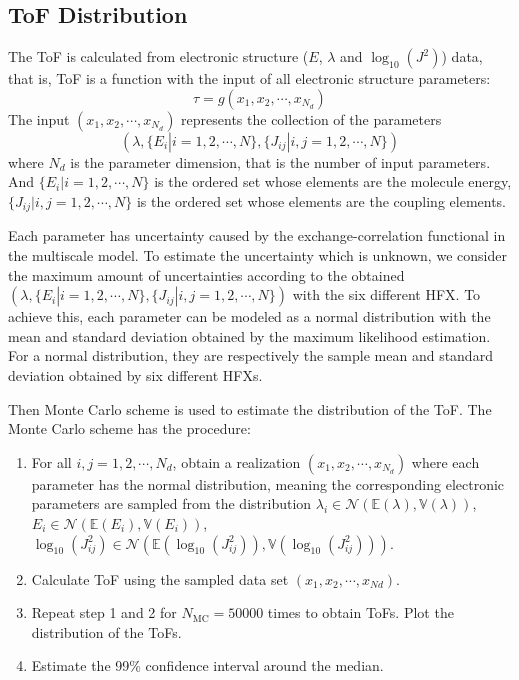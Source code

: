 \documentclass[%
 reprint,
 amsmath,amssymb,
 aps,
]{revtex4-2}
\begin{document}
\subsection{ToF Distribution}
The ToF is calculated from electronic structure ($E$, $\lambda$ and $\log_{10}(J^2)$) data, that is, ToF is a function with the input of all electronic structure parameters:
\begin{equation}
    \tau = g(x_1, x_2, \cdots, x_{N_d})
    \label{eq:tau1}
\end{equation}
The input $(x_1, x_2, \cdots, x_{N_d})$ represents the collection of the parameters $$(\lambda, \{E_i|i=1,2,\cdots,N \}, \{J_{ij}|i,j=1,2,\cdots,N \})$$  where $N_d$ is the parameter dimension, that is the number of input parameters. 
And $\{E_i|i=1,2,\cdots,N \}$ is the ordered set whose elements are the molecule energy,
$\{J_{ij}|i,j=1,2,\cdots,N \}$ is the ordered set whose elements are the coupling elements. 

Each parameter has uncertainty caused by the exchange-correlation functional in the multiscale model.
To estimate the uncertainty which is unknown, we consider the maximum amount of uncertainties according to the obtained $(\lambda, \{E_i|i=1,2,\cdots,N \}, \{J_{ij}|i,j=1,2,\cdots,N \})$ with the six different HFX.
To achieve this, each parameter can be modeled as a normal distribution with the mean and standard deviation obtained by the maximum likelihood estimation. For a normal distribution, they are respectively the sample mean and standard deviation obtained by six different HFXs.

Then Monte Carlo scheme is used to estimate the distribution of the ToF. The Monte Carlo scheme has the procedure:
\begin{enumerate}
\item For all $i,j=1,2,\cdots, N_d$, obtain a realization $(x_1, x_2, \cdots, x_{N_d})$ where each parameter has the normal distribution, meaning the corresponding electronic parameters are sampled from the distribution $\lambda_i \in \mathcal{N}(\mathbb{E}(\lambda), \mathbb{V}(\lambda))$, $E_i \in \mathcal{N}(\mathbb{E}(E_i), \mathbb{V}(E_i))$, $\log_{10}(J_{ij}^2) \in \mathcal{N}(\mathbb{E}(\log_{10}(J_{ij}^2)), \mathbb{V}(\log_{10}(J_{ij}^2)))$. 
\item Calculate ToF using the sampled data set $(x_1, x_2, \cdots, x_{Nd})$. 
\item Repeat step 1 and 2 for $N_\text{MC} = 50000$ times to obtain ToFs. Plot the distribution of the ToFs.
\item Estimate the 99\% confidence interval around the median.
\end{enumerate}
\end{document}
